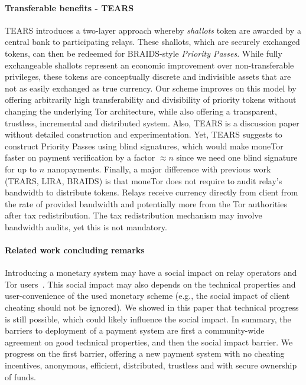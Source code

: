 \paragraph*{Transferable benefits - TEARS} TEARS introduces a two-layer approach whereby \emph{shallots}
token are awarded by a central bank to participating relays. These shallots,
which are securely exchanged tokens, can then be redeemed for BRAIDS-style
\emph{Priority Passes}. While fully exchangeable shallots represent an economic
improvement over non-transferable privileges, these tokens are conceptually
discrete and indivisible assets that are not as easily exchanged as true
currency. Our scheme improves on this model by offering arbitrarily high
transferability and divisibility of priority tokens without changing the
underlying Tor architecture, while also offering a transparent, trustless, incremental and distributed system. Also, TEARS is a discussion paper without detailed construction and experimentation. Yet, TEARS suggests to construct Priority Passes using blind signatures, which would make moneTor faster on payment verification by a factor $\approx n$ since we need one blind signature for up to $n$ nanopayments. Finally, a major difference with previous work (TEARS, LIRA, BRAIDS) is that moneTor does not require to audit relay's bandwidth to distribute tokens. Relays receive currency directly from client from the rate of provided bandwidth and potentially more from the Tor authorities after tax redistribution. The tax redistribution mechanism may involve bandwidth audits, yet this is not mandatory.

\paragraph*{Related work concluding remarks}
Introducing a monetary system may have a social impact on relay operators and Tor users~\cite{jansenblogpost}. This social impact may also depends on the technical properties and user-convenience of the used monetary scheme (e.g., the social impact of client cheating should not be ignored). We showed in this paper that technical progress is still possible, which could likely influence the social impact. In summary, the barriers to deployment of a payment system are first a community-wide agreement on good technical properties, and then the social impact barrier. We progress on the first barrier, offering a new payment system with no cheating incentives, anonymous, efficient, distributed, trustless and with secure ownership of funds.


